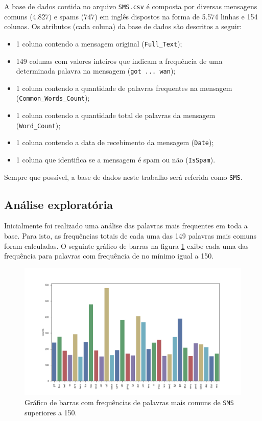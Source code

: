 \documentclass[a4paper,11pt]{article}
\begin{document}
A base de dados contida no arquivo \texttt{SMS.csv} é composta por diversas mensagens comuns (4.827)
e spams (747) em inglês dispostos na forma de 5.574 linhas e 154 colunas. Os atributos (cada coluna) 
da base de dados são descritos a seguir:

\begin{itemize}
 \item 1 coluna contendo a mensagem original (\texttt{Full\_Text});
 \item 149 colunas com valores inteiros que indicam a frequência de uma determinada palavra na 
 mensagem (\texttt{got ... wan});
 \item 1 coluna contendo a quantidade de palavras frequentes na mensagem 
 (\texttt{Common\_Words\_Count});
 \item 1 coluna contendo a quantidade total de palavras da mensagem (\texttt{Word\_Count});
 \item 1 coluna contendo a data de recebimento da mensagem (\texttt{Date});
 \item 1 coluna que identifica se a mensagem é spam ou não (\texttt{IsSpam}).
\end{itemize}

Sempre que possível, a base de dados neste trabalho será referida como \texttt{SMS}.



\subsection{Análise exploratória}

Inicialmente foi realizado uma análise das palavras mais frequentes em toda a base. Para isto, 
as frequências totais de cada uma das 149 palavras mais comuns foram calculadas. O seguinte gráfico 
de barras na figura \ref{fig:barplot} exibe cada uma das frequência para palavras com frequência de 
no mínimo igual a 150.

\begin{figure}[htbp]
    \centering
    \includegraphics[width=\textwidth]{word_barplot.png}
    \caption[Figura simples]{Gráfico de barras com frequências de palavras mais comuns de 
    \texttt{SMS} superiores a 150.}
    \label{fig:barplot}
\end{figure}
\end{document}
